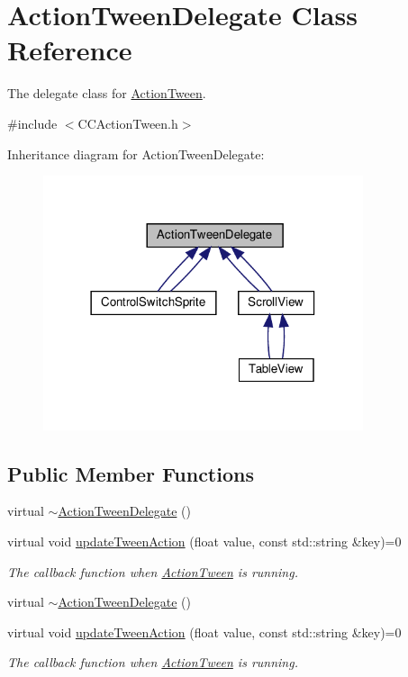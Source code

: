\hypertarget{classActionTweenDelegate}{}\section{Action\+Tween\+Delegate Class Reference}
\label{classActionTweenDelegate}


The delegate class for \hyperlink{classActionTween}{Action\+Tween}.  




{\ttfamily \#include $<$C\+C\+Action\+Tween.\+h$>$}



Inheritance diagram for Action\+Tween\+Delegate\+:
\nopagebreak
\begin{figure}[H]
\begin{center}
\leavevmode
\includegraphics[width=266pt]{classActionTweenDelegate__inherit__graph}
\end{center}
\end{figure}
\subsection*{Public Member Functions}
\begin{DoxyCompactItemize}
\item 
virtual \hyperlink{classActionTweenDelegate_aafecfad24eba11952027e807af3405e0}{$\sim$\+Action\+Tween\+Delegate} ()
\item 
virtual void \hyperlink{classActionTweenDelegate_a6cb6dce375e29bd38af1a81001eeac66}{update\+Tween\+Action} (float value, const std\+::string \&key)=0
\begin{DoxyCompactList}\small\item\em The callback function when \hyperlink{classActionTween}{Action\+Tween} is running. \end{DoxyCompactList}\item 
virtual \hyperlink{classActionTweenDelegate_aafecfad24eba11952027e807af3405e0}{$\sim$\+Action\+Tween\+Delegate} ()
\item 
virtual void \hyperlink{classActionTweenDelegate_a6cb6dce375e29bd38af1a81001eeac66}{update\+Tween\+Action} (float value, const std\+::string \&key)=0
\begin{DoxyCompactList}\small\item\em The callback function when \hyperlink{classActionTween}{Action\+Tween} is running. \end{DoxyCompactList}\end{DoxyCompactItemize}


